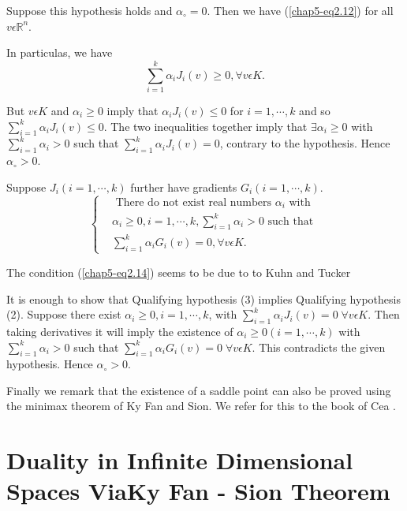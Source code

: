 Suppose this hypothesis holds and $\alpha_{\circ} = 0$. Then we have (\ref{chap5-eq2.12}) for all $v \epsilon \mathbb{R}^{n}$.

In particulas, we have
$$
\sum\limits_{i=1}^{k} \alpha_{i} J_{i} (v) \geq 0, \forall v \epsilon K.
$$

But $v \epsilon K$ and $\alpha_{i} \geq 0$ imply that $\alpha_{i} J_{i} (v) \leq 0$ for $i = 1, \cdots , k$ and so $\sum\limits_{i=1}^{k} \alpha_{i} J_{i}(v) \leq 0$. The two inequalities together imply that $\exists \alpha_{i} \geq 0$ with $\sum\limits_{i=1}^{k} \alpha_{i} > 0$ such that $\sum\limits_{i=1}^{k} \alpha_{i} J_{i} (v) = 0$, contrary to the hypothesis. Hence $\alpha_{\circ} > 0$.

\medskip
{}\pageoriginale Suppose $J_{i} (i = 1, \cdots, k)$ further have gradients $G_{i} (i = 1, \cdots, k)$.
\begin{equation*}
\begin{cases}
& \text{ There do not exist real numbers } \alpha_{i} \text{ with }\\
& \alpha_{i} \geq 0, i = 1, \cdots, k, \sum\limits_{i=1}^{k} \alpha_{i} > 0 \text{ such that }\\
& \sum\limits_{i=1}^{k} \alpha_{i} G_{i}(v) = 0, \forall v \epsilon K.\tag{2.14}\label{chap5-eq2.14}
\end{cases}
\end{equation*}

The condition (\ref{chap5-eq2.14}) seems to be due to to Kuhn and Tucker \cite{key28}

It is enough to show that Qualifying hypothesis (3) implies Qualifying hypothesis (2). Suppose there exist $\alpha_{i} \geq 0, i = 1, \cdots, k$, with $\sum\limits_{i=1}^{k} \alpha_{i} J_{i}(v) = 0 \; \forall v \epsilon K$. Then taking derivatives it will imply the existence of $\alpha_{i} \geq 0 (i = 1, \cdots , k)$ with $\sum\limits_{i=1}^{k} \alpha_{i} > 0$ such that $\sum\limits_{i=1}^{k} \alpha_{i} G_{i}(v) = 0 \; \forall v \epsilon K$. This contradicts the given hypothesis. Hence $\alpha_{\circ} > 0$.

Finally we remark that the existence of a saddle point can also be proved using the minimax theorem of Ky Fan and Sion. We refer for this to the book of Cea \cite{key6}.

\section[Duality in Infinite Dimensional Spaces Via...]{Duality in
  Infinite Dimensional Spaces Via\hfil\break Ky Fan - Sion
  Theorem}\label{chap5-sec3} 

